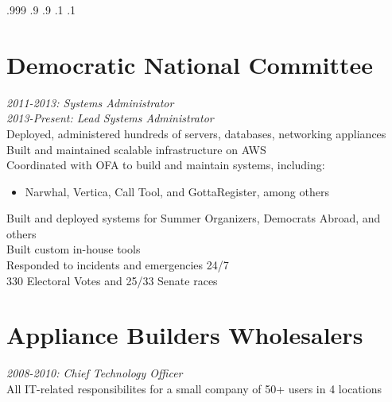\documentclass[9pt]{res} %
\begin{document}

\moveleft.999\hoffset{}  
\moveleft.9\hoffset{}
\moveleft.9\hoffset{}
\vspace{-7mm}
\moveright.1\hoffset{}
\moveright.1\hoffset{}
\begin{resume}

\vspace{-8mm}
\section{Democratic National Committee} 

{\sl 2011-2013: Systems Administrator} \\
{\sl 2013-Present: Lead Systems Administrator} \\
Deployed, administered hundreds of servers, databases, networking appliances \\
Built and maintained scalable infrastructure on AWS \\
Coordinated with OFA to build and maintain systems, including:
\begin{itemize} \item Narwhal, Vertica, Call Tool, and GottaRegister, among others \end{itemize}
\vspace{-4mm}
Built and deployed systems for Summer Organizers, Democrats Abroad, and others \\
Built custom in-house tools \\
Responded to incidents and emergencies 24/7 \\ 
330 Electoral Votes and 25/33 Senate races


\vspace{-2mm}
\section{Appliance Builders Wholesalers} 

{\sl 2008-2010: Chief Technology Officer} \\ 
All IT-related responsibilites for a small company of 50+ users in 4 locations


\end{resume}
\end{document}
